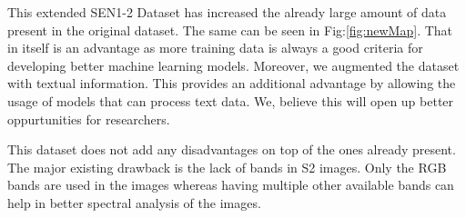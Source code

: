 This extended SEN1-2 Dataset has increased the already large amount of data present in the original dataset. The same can be seen in Fig:\ref{fig:newMap}. That in itself is an advantage as more training data is always a good criteria for developing better machine learning models. Moreover, we augmented the dataset with textual information. This provides an additional advantage by allowing the usage of models that can process text data. We, believe this will open up better oppurtunities for researchers.

This dataset does not add any disadvantages on top of the ones already present. The major existing drawback is the lack of bands in S2 images. Only the RGB bands are used in the images whereas having multiple other available bands can help in better spectral analysis of the images.